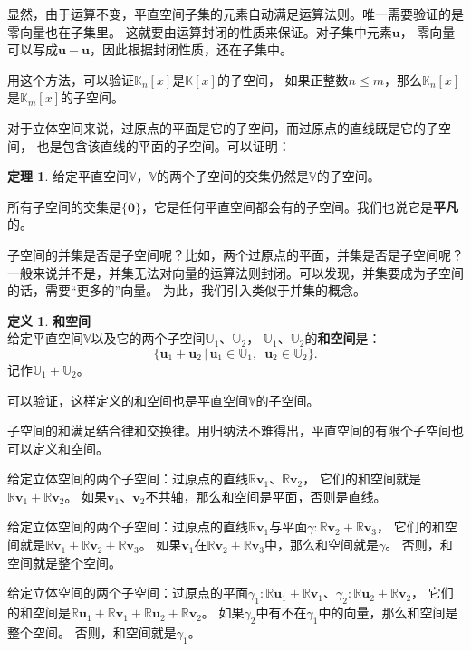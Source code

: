 \documentclass[12pt,UTF8]{ctexbook}
\theoremstyle{definition}
\newtheorem{df}{定义}[section]
\newtheorem{tm}{定理}[section]
\theoremstyle{plain}
\begin{document}
显然，由于运算不变，平直空间子集的元素自动满足运算法则。唯一需要验证的是零向量也在子集里。
这就要由运算封闭的性质来保证。对子集中元素$\mathbf{u}$，
零向量可以写成$\mathbf{u} - \mathbf{u}$，因此根据封闭性质，还在子集中。

用这个方法，可以验证$\mathbb{K}_n[x]$是$\mathbb{K}[x]$的子空间，
如果正整数$n\leqslant m$，那么$\mathbb{K}_n[x]$是$\mathbb{K}_m[x]$的子空间。

对于立体空间来说，过原点的平面是它的子空间，而过原点的直线既是它的子空间，
也是包含该直线的平面的子空间。可以证明：

\begin{tm}
    给定平直空间$\mathbb{V}$，$\mathbb{V}$的两个子空间的交集仍然是$\mathbb{V}$的子空间。
\end{tm}

所有子空间的交集是$\{\mathbf{0}\}$，它是任何平直空间都会有的子空间。我们也说它是\textbf{平凡}的。

子空间的并集是否是子空间呢？比如，两个过原点的平面，并集是否是子空间呢？
一般来说并不是，并集无法对向量的运算法则封闭。可以发现，并集要成为子空间的话，需要“更多的”向量。
为此，我们引入类似于并集的概念。

\begin{df}{\textbf{和空间}}
    \mbox{} \\
    给定平直空间$\mathbb{V}$以及它的两个子空间$\mathbb{U}_1$、$\mathbb{U}_2$，
    $\mathbb{U}_1$、$\mathbb{U}_2$的\textbf{和空间}是：
    $$ \{ \mathbf{u}_1 + \mathbf{u}_2\,|\, \mathbf{u}_1 \in \mathbb{U}_1,\,\,\, \mathbf{u}_2 \in \mathbb{U}_2\}.$$
    记作$\mathbb{U}_1 + \mathbb{U}_2$。
\end{df}
可以验证，这样定义的和空间也是平直空间$\mathbb{V}$的子空间。

子空间的和满足结合律和交换律。用归纳法不难得出，平直空间的有限个子空间也可以定义和空间。

给定立体空间的两个子空间：过原点的直线$\mathbb{R}\mathbf{v}_1$、$\mathbb{R}\mathbf{v}_2$，
它们的和空间就是$\mathbb{R}\mathbf{v}_1 + \mathbb{R}\mathbf{v}_2$。
如果$\mathbf{v}_1$、$\mathbf{v}_2$不共轴，那么和空间是平面，否则是直线。

给定立体空间的两个子空间：过原点的直线$\mathbb{R}\mathbf{v}_1$与平面$\gamma: \mathbb{R}\mathbf{v}_2 + \mathbb{R}\mathbf{v}_3$，
它们的和空间就是$\mathbb{R}\mathbf{v}_1 + \mathbb{R}\mathbf{v}_2 + \mathbb{R}\mathbf{v}_3$。
如果$\mathbf{v}_1$在$\mathbb{R}\mathbf{v}_2 + \mathbb{R}\mathbf{v}_3$中，那么和空间就是$\gamma$。
否则，和空间就是整个空间。

给定立体空间的两个子空间：过原点的平面$\gamma_1: \mathbb{R}\mathbf{u}_1 + \mathbb{R}\mathbf{v}_1$、$\gamma_2: \mathbb{R}\mathbf{u}_2 + \mathbb{R}\mathbf{v}_2$，
它们的和空间是$\mathbb{R}\mathbf{u}_1 + \mathbb{R}\mathbf{v}_1 + \mathbb{R}\mathbf{u}_2 + \mathbb{R}\mathbf{v}_2$。
如果$\gamma_2$中有不在$\gamma_1$中的向量，那么和空间是整个空间。
否则，和空间就是$\gamma_1$。
\end{document}
